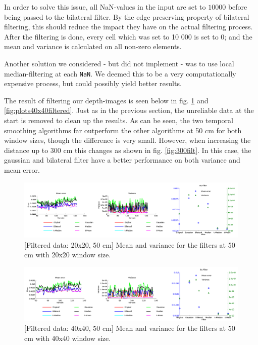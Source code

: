 \documentclass[11pt]{article}
\begin{document}


In order to solve this issue, all NaN-values in the input are set to $10000$
before being passed to the bilateral filter. By the edge preserving property of
bilateral filtering, this should reduce the impact they have on the actual
filtering process. After the filtering is done, every cell which was set to 10
000 is set to 0; and the mean and variance is calculated on all non-zero
elements. \par

Another solution we considered - but did not implement - was to use local
median-filtering at each \texttt{NaN}. We deemed this to be a very
computationally expensive process, but could possibly yield better results. \par

The result of filtering our depth-images is seen below in
fig. \ref{fig:plots20x20filtered} and \vref{fig:plots40x40filtered}. Just as in
the previous section, the unreliable data at the start is removed to clean up
the results. As can be seen, the two temporal smoothing algorithms far
outperform the other algorithms at 50 cm for both window sizes, though the
difference is very small. However, when increasing the distance up to 300 cm
this changes as shown in fig. \vref{fig:300filt}. In this case, the gaussian 
and bilateral filter have a better performance on both variance and mean error. 

\begin{figure}[ht]
  \centering
  \includegraphics[width=1\textwidth]{figures/plot20x20filtered.png}
  [Filtered data: 20x20, 50 cm]{\label{fig:plots20x20filtered}
    Mean and variance for the filters at 50 cm with 20x20 window size.}
\end{figure}
\begin{figure}[ht]
  \begin{center}
    \includegraphics[width=1\textwidth]{figures/plot40x40filtered.png}
    [Filtered data: 40x40, 50
    cm]{\label{fig:plots40x40filtered} Mean and variance for the filters at 50
      cm with 40x40 window size.}
  \end{center}
\end{figure}
\end{document}
